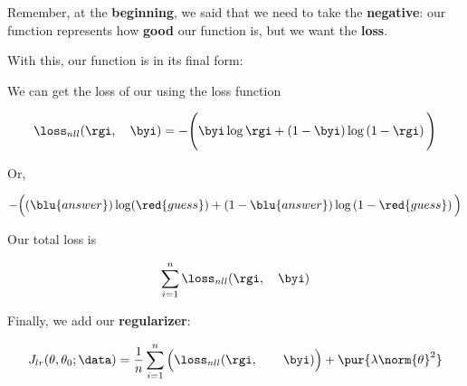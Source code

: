        Remember, at the \textbf{beginning}, we said that we need to take the \textbf{negative}: our function represents how \textbf{good} our function is, but we want the \textbf{loss}.
        
        With this, our function is in its final form:\\
        
        \begin{kequation}
            We can get the loss of our  using the  loss function
            
            \begin{equation*}
                \loss_{nll}
                (\rgi ,\quad \byi)
                =
                -
                \Bigg(
                    \byi \log{\rgi}
                    +
                    \left( 1 - \byi \right)
                    \log
                    \left( 1-\rgi \right) 
                \Bigg)
            \end{equation*}
            
            Or,
            
            \begin{equation*}
                -
                \Big(
                    (\blu{answer}) \log(\red{guess})
                    +
                    \left( 1 - \blu{answer} \right)
                    \log
                    \left( 1-\red{guess} \right) 
                \Big)
            \end{equation*}
        \end{kequation}
        
        Our total loss is
        
        \begin{equation}
            \sum_{i=1}^n 
            \loss_{nll}(\rgi ,\quad \byi)
        \end{equation}
        
        Finally, we add our \textbf{regularizer}:
        
        \begin{equation}
            J_{lr}(\theta,\theta_0;\data)
            =
            \frac{1}{n} \sum_{i=1}^n 
            \Big(
                \loss_{nll}(\rgi ,\quad \quad \byi)
            \Big)
            +
            \pur{ \lambda \norm{\theta}^2 }
        \end{equation}
        
